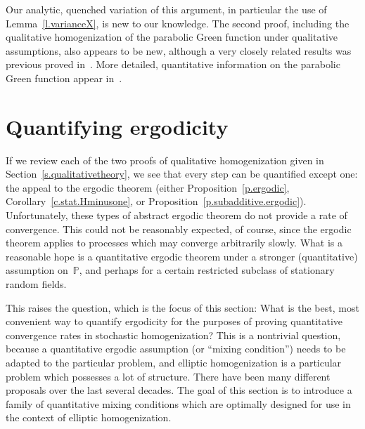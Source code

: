 \documentclass[11pt]{article} %
\numberwithin{equation}{section}
\theoremstyle{definition}
\renewcommand{\P}{\mathbb{P}}
\begin{document}
Our analytic, quenched variation of this argument, in particular the use of Lemma~\ref{l.varianceX}, is new to our knowledge. The second proof, including the qualitative homogenization of the parabolic Green function under qualitative assumptions, also appears to be new, although a very closely related results was previous proved in~\cite[Section 8.6]{AKMBook}. More detailed, quantitative information on the parabolic Green function appear in~\cite[Chapter 9]{AKMBook}.












\section{Quantifying ergodicity}
\label{s.CFS} 

If we review each of the two proofs of qualitative homogenization given in Section~\ref{s.qualitativetheory}, we see that every step can be quantified except one: the appeal to the ergodic theorem (either Proposition~\ref{p.ergodic}, Corollary~\ref{c.stat.Hminusone}, or Proposition~\ref{p.subadditive.ergodic}). Unfortunately, these types of abstract ergodic theorem do not provide a rate of convergence. This could not be reasonably expected, of course, since the ergodic theorem applies to processes which may converge arbitrarily slowly. What is a reasonable hope is a quantitative ergodic theorem under a stronger (quantitative) assumption on~$\P$, and perhaps for a certain restricted subclass of stationary random fields. 

\smallskip

This raises the question, which is the focus of this section: What is the best, most convenient way to quantify ergodicity for the purposes of proving quantitative convergence rates in stochastic homogenization? 
This is a nontrivial question, because a quantitative ergodic assumption (or ``mixing condition'')  needs to be adapted to the particular problem, and elliptic homogenization is a particular problem which possesses a lot of structure. 
There have been many different proposals over the last several decades. 
The goal of this section is to introduce a family of quantitative mixing conditions which are optimally designed for use in the context of elliptic homogenization.
\end{document}
